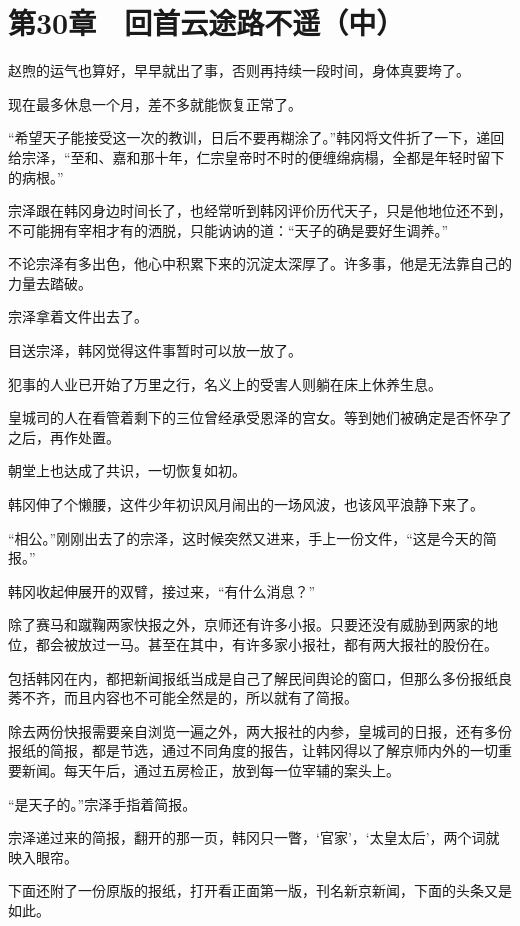 \section{第30章　回首云途路不遥（中）}

赵煦的运气也算好，早早就出了事，否则再持续一段时间，身体真要垮了。

现在最多休息一个月，差不多就能恢复正常了。

“希望天子能接受这一次的教训，日后不要再糊涂了。”韩冈将文件折了一下，递回给宗泽，“至和、嘉和那十年，仁宗皇帝时不时的便缠绵病榻，全都是年轻时留下的病根。”

宗泽跟在韩冈身边时间长了，也经常听到韩冈评价历代天子，只是他地位还不到，不可能拥有宰相才有的洒脱，只能讷讷的道：“天子的确是要好生调养。”

不论宗泽有多出色，他心中积累下来的沉淀太深厚了。许多事，他是无法靠自己的力量去踏破。

宗泽拿着文件出去了。

目送宗泽，韩冈觉得这件事暂时可以放一放了。

犯事的人业已开始了万里之行，名义上的受害人则躺在床上休养生息。

皇城司的人在看管着剩下的三位曾经承受恩泽的宫女。等到她们被确定是否怀孕了之后，再作处置。

朝堂上也达成了共识，一切恢复如初。

韩冈伸了个懒腰，这件少年初识风月闹出的一场风波，也该风平浪静下来了。

“相公。”刚刚出去了的宗泽，这时候突然又进来，手上一份文件，“这是今天的简报。”

韩冈收起伸展开的双臂，接过来，“有什么消息？”

除了赛马和蹴鞠两家快报之外，京师还有许多小报。只要还没有威胁到两家的地位，都会被放过一马。甚至在其中，有许多家小报社，都有两大报社的股份在。

包括韩冈在内，都把新闻报纸当成是自己了解民间舆论的窗口，但那么多份报纸良莠不齐，而且内容也不可能全然是的，所以就有了简报。

除去两份快报需要亲自浏览一遍之外，两大报社的内参，皇城司的日报，还有多份报纸的简报，都是节选，通过不同角度的报告，让韩冈得以了解京师内外的一切重要新闻。每天午后，通过五房检正，放到每一位宰辅的案头上。

“是天子的。”宗泽手指着简报。

宗泽递过来的简报，翻开的那一页，韩冈只一瞥，‘官家’，‘太皇太后’，两个词就映入眼帘。

下面还附了一份原版的报纸，打开看正面第一版，刊名新京新闻，下面的头条又是如此。

